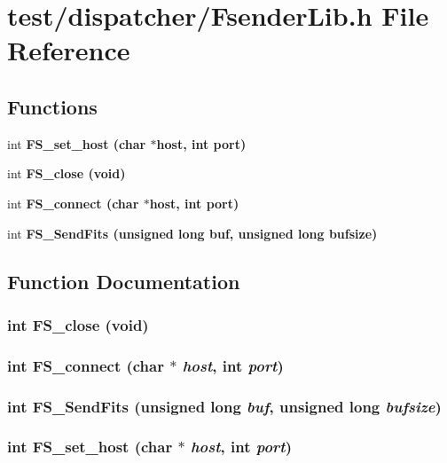 \section{test/dispatcher/Fsender\-Lib.h File Reference}
\label{FsenderLib_8h}
\subsection*{Functions}
\begin{CompactItemize}
\item 
int \bf{FS\_\-set\_\-host} (char $\ast$host, int port)
\item 
int \bf{FS\_\-close} (void)
\item 
int \bf{FS\_\-connect} (char $\ast$host, int port)
\item 
int \bf{FS\_\-Send\-Fits} (unsigned long buf, unsigned long bufsize)
\end{CompactItemize}


\subsection{Function Documentation}
\subsubsection{\setlength{\rightskip}{0pt plus 5cm}int FS\_\-close (void)}\label{FsenderLib_8h_038eb319822692777b0feec260da2e39}


\subsubsection{\setlength{\rightskip}{0pt plus 5cm}int FS\_\-connect (char $\ast$ {\em host}, int {\em port})}\label{FsenderLib_8h_39d55c4b8b1d2056927d7be502c18282}


\subsubsection{\setlength{\rightskip}{0pt plus 5cm}int FS\_\-Send\-Fits (unsigned long {\em buf}, unsigned long {\em bufsize})}\label{FsenderLib_8h_dac28fa51c9fd2a4f21d0c44a6651584}


\subsubsection{\setlength{\rightskip}{0pt plus 5cm}int FS\_\-set\_\-host (char $\ast$ {\em host}, int {\em port})}\label{FsenderLib_8h_d7595a83319ff70a2c7b28694c706868}


